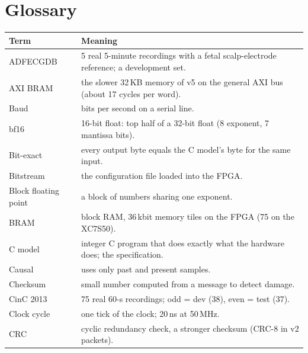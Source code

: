 \documentclass[11pt]{article}
\begin{document}
\begin{viva}
\end{viva}

\section{Glossary}
\label{sec:gloss}

\begin{center}
\small
\begin{longtable}{@{}p{3.6cm} p{11.4cm}@{}}
\toprule
\textbf{Term} & \textbf{Meaning} \\
\midrule
\endhead
ADFECGDB & 5 real 5-minute recordings with a fetal scalp-electrode reference; a development set. \\
AXI BRAM & the slower 32\,KB memory of v5 on the general AXI bus (about 17 cycles per word). \\
Baud & bits per second on a serial line. \\
bf16 & 16-bit float: top half of a 32-bit float (8 exponent, 7 mantissa bits). \\
Bit-exact & every output byte equals the C model's byte for the same input. \\
Bitstream & the configuration file loaded into the FPGA. \\
Block floating point & a block of numbers sharing one exponent. \\
BRAM & block RAM, 36\,kbit memory tiles on the FPGA (75 on the XC7S50). \\
C model & integer C program that does exactly what the hardware does; the specification. \\
Causal & uses only past and present samples. \\
Checksum & small number computed from a message to detect damage. \\
CinC 2013 & 75 real 60-s recordings; odd = dev (38), even = test (37). \\
Clock cycle & one tick of the clock; 20\,ns at 50\,MHz. \\
CRC & cyclic redundancy check, a stronger checksum (CRC-8 in v2 packets). \\

\end{longtable}
\end{center}
\end{document}
